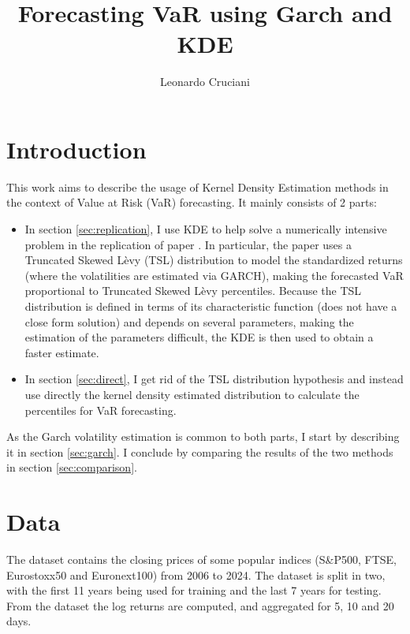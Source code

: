 \documentclass[12pt]{article}
\author{Leonardo Cruciani}
\title{Forecasting VaR using Garch and KDE}
\begin{document}
    \maketitle
    \section{Introduction}
        This work aims to describe the usage of Kernel Density Estimation methods in the context of Value at Risk (VaR) forecasting.
        It mainly consists of 2 parts:
        \begin{itemize}
            \item In section \ref{sec:replication}, I use KDE to help solve a numerically intensive problem in the replication of paper \cite{thorsten}.
            In particular, the paper uses a Truncated Skewed Lèvy (TSL) distribution to model the standardized returns (where the volatilities are estimated via GARCH),
            making the forecasted VaR proportional to Truncated Skewed Lèvy percentiles.
            Because the TSL distribution is defined in terms of its characteristic function (does not have a close form solution) and depends on several parameters, making the estimation of the parameters difficult, the KDE is then used to obtain a faster estimate.
            \item In section \ref{sec:direct}, I get rid of the TSL distribution hypothesis and instead use directly the kernel density estimated distribution to calculate the percentiles for VaR forecasting.
        \end{itemize}
        As the Garch volatility estimation is common to both parts, I start by describing it in section \ref{sec:garch}.
        I conclude by comparing the results of the two methods in section \ref{sec:comparison}.

    \section{Data}
        The dataset contains the closing prices of some popular indices (S\&P500, FTSE, Eurostoxx50 and Euronext100) from 2006 to 2024.
        The dataset is split in two, with the first 11 years being used for training and the last 7 years for testing.
        From the dataset the log returns are computed, and aggregated for 5, 10 and 20 days.
\end{document}
